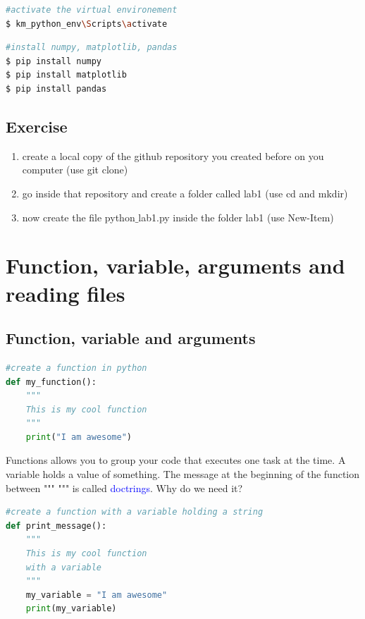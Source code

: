 \documentclass[10pt,a4paper,titlepage]{article}
\begin{document}
\begin{lstlisting}[language=bash]
#activate the virtual environement
$ km_python_env\Scripts\activate
\end{lstlisting}

\begin{lstlisting}[language=bash]
#install numpy, matplotlib, pandas
$ pip install numpy
$ pip install matplotlib
$ pip install pandas
\end{lstlisting}


\subsection{Exercise}
\begin{enumerate}
	\item create a local copy of the github repository you created before on you computer (use git clone)
	\item go inside that repository and create a folder called lab1 (use cd and mkdir)
	\item now create the file python$\_$lab1.py inside the folder lab1 (use New-Item)
\end{enumerate}

\section{Function, variable, arguments and reading files}
\subsection{Function, variable and arguments}
\begin{lstlisting}[language=python]
#create a function in python 
def my_function():
	"""
	This is my cool function
	"""
	print("I am awesome")
\end{lstlisting}

\justify
Functions allows you to group your code that executes one task at the time. A variable holds a value of something.
The message at the beginning of the function between """   """ is called \textcolor{blue}{doctrings}. Why do we need it?
\clearpage
\begin{lstlisting}[language=python]
#create a function with a variable holding a string 
def print_message():
	"""
	This is my cool function
	with a variable
	"""
	my_variable = "I am awesome"
	print(my_variable)
\end{lstlisting}
\justify
\end{document}

